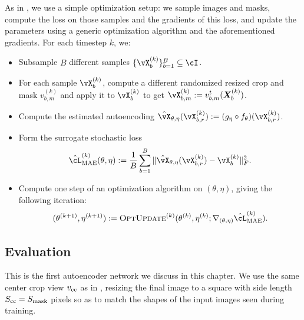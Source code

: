 \documentclass[../../book-main.tex]{subfiles}
\begin{document}
As in , we use a simple optimization setup: we sample images and masks, compute the loss on those samples and the gradients of this loss, and update the parameters using a generic optimization algorithm and the aforementioned gradients. For each timestep \(k\), we:
\begin{itemize}
    \item Subsample \(B\) different samples \(\{\vX_{b}^{(k)}\}_{b = 1}^{B} \subseteq \cI\).
    \item For each sample \(\vX_{b}^{(k)}\), compute a different randomized resized crop and mask \(v_{b, m}^{(k)}\) and apply it to \(\vX_{b}^{(k)}\) to get \(\vX_{b, m}^{(k)} := v_{b, m}^{t}(\X_{b}^{(k)})\).
    \item Compute the estimated autoencoding \(\hat{\vX}_{\theta, \eta}(\vX_{b, r}^{(k)}) := (g_{\eta} \circ f_{\theta})(\vX_{b, r}^{(k)})\).
    \item Form the surrogate stochastic loss 
    \begin{equation}
        \hat{\cL}_{\mathrm{MAE}}^{(k)}(\theta, \eta) := \frac{1}{B}\sum_{b = 1}^{B}\norm{\hat{\vX}_{\theta, \eta}(\vX_{b, r}^{(k)}) - \vX_{b}^{(k)}}_{F}^{2}.
    \end{equation}
    \item Compute one step of an optimization algorithm on \((\theta, \eta)\), giving the following iteration:
    \begin{equation}
        (\theta^{(k + 1)}, \eta^{(k + 1)}) := \textsc{OptUpdate}^{(k)}(\theta^{(k)}, \eta^{(k)}; \nabla_{(\theta, \eta)}\hat{\cL}_{\mathrm{MAE}}^{(k)}).
    \end{equation}
\end{itemize}

\subsection{Evaluation} \label{sub:image_completion_optimization_1}

This is the first autoencoder network we discuss in this chapter. We use the same center crop view \(v_{\mathrm{cc}}\) as in , resizing the final image to a square with side length \(S_{\mathrm{cc}} = S_{\mathrm{mask}}\) pixels so as to match the shapes of the input images seen during training. 
\end{document}
